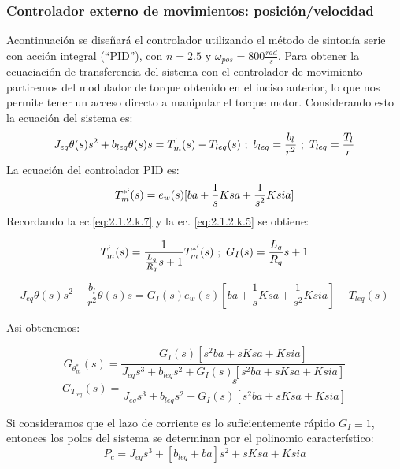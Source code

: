 \documentclass[10pt]{article}
\begin{document}
\subsubsection{Controlador externo de movimientos: posición/velocidad }
Acontinuación se diseñará el controlador utilizando el método de sintonía serie con acción integral (``PID''), con $n=2.5$ y $\omega_{pos}=800\frac{rad}{s}$. Para obtener la ecuaciación de transferencia del sistema con el controlador de movimiento partiremos del modulador de torque obtenido en el inciso anterior, lo que nos permite tener un acceso directo a manipular el torque motor. Considerando esto la ecuación del sistema es:
		\begin{equation}
	J_{eq}\theta(s)s^{2}+b_{leq}\theta(s)s=T^{`}_{m}(s)-T_{leq}(s) \ ; \ b_{leq}= \frac{b_{l}}{r^{2}} \ ; \ T_{leq}= \frac{T_{l}}{r}
	\label{eq:2.1.2.q.1}
	\end{equation}
La ecuación del controlador PID es:
		\begin{equation}
	T^{*`}_{m}(s)=e_{w}(s)[ba+\frac{1}{s}Ksa + \frac{1}{s^{2}}Ksia]
	\label{eq:2.1.2.q.2}
	\end{equation}
Recordando la ec.\ref{eq:2.1.2.k.7} y la ec. \ref{eq:2.1.2.k.5} se obtiene:

	\begin{equation}
	T^{`}_{m}(s)=\frac{1}{\frac{L_{q}}{R_{q}}s+1}T^{*'}_{m}(s) \ ; \ G_{I}(s)=\frac{L_{q}}{R_{q}}s+1
	\label{eq:2.1.2.q.4}
	\end{equation}

	\begin{equation}
	J_{eq}\theta(s)s^{2}+\frac{b_{l}}{r^{2}}\theta(s)s=G_{I}(s)e_{w}(s)[ba+\frac{1}{s}Ksa + \frac{1}{s^{2}}Ksia]-T_{leq}(s)
	\label{eq:2.1.2.q.5}
	\end{equation}
	
Asi obtenemos:
 
	\begin{equation}
	G_{\theta^{*}_{m}}(s)=\frac{G_{I}(s)[s^{2}ba+sKsa+Ksia]}{J_{eq}s^{3}+b_{leq}s^{2}+G_{I}(s)[s^{2}ba+sKsa+Ksia]}
	\label{eq:2.1.2.q.6}
	\end{equation}
 	\begin{equation}
	G_{T_{leq}}(s)=\frac{s}{J_{eq}s^{3}+b_{leq}s^{2}+G_{I}(s)[s^{2}ba+sKsa+Ksia]}
	\label{eq:2.1.2.q.6}
	\end{equation}
	
	Si consideramos que el lazo de corriente es lo suficientemente rápido $G_{I}\equiv 1$, entonces los polos del sistema se determinan por el polinomio característico:
	\begin{equation}
	P_{c}=J_{eq}s^{3}+[b_{leq}+ba]s^{2}+sKsa+Ksia
	\label{eq:2.1.2.q.7}
	\end{equation}
	
\end{document}
